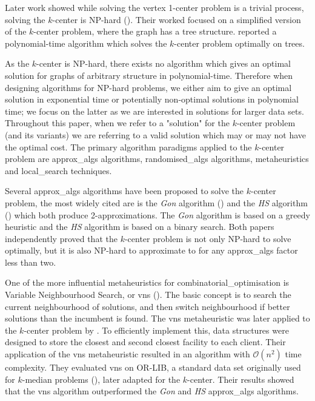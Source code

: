 Later work showed while solving the vertex 1-center problem is a trivial process, solving the $k$-center is NP-hard (\cite{kariv_algorithmic_1979}). Their worked focused on a simplified version of the $k$-center problem, where the graph has a \gls{tree} structure. \textcite{kariv_algorithmic_1979} reported a polynomial-time algorithm which solves the $k$-center problem optimally on trees.

As the $k$-center is NP-hard, there exists no algorithm which gives an optimal solution for graphs of arbitrary structure in polynomial-time. Therefore when designing algorithms for NP-hard problems, we either aim to give an optimal solution in exponential time or potentially non-optimal solutions in polynomial time; we focus on the latter as we are interested in solutions for larger data sets. Throughout this paper, when we refer to a "solution" for the $k$-center problem (and its variants) we are referring to a valid solution which may or may not have the optimal cost. The primary algorithm paradigms applied to the $k$-center problem are \gls{approx_algs} algorithms, \gls{randomised_algs} algorithms, \glspl{metaheuristic} and \gls{local_search} techniques.

Several \gls{approx_algs} algorithms have been proposed to solve the $k$-center problem, the most widely cited are is the \emph{Gon} algorithm (\cite{gonzalez_clustering_1985}) and the \emph{HS} algorithm (\cite{hochbaum_best_1985}) which both produce 2-approximations. The \emph{Gon} algorithm is based on a greedy \gls{heuristic} and the \emph{HS} algorithm is based on a binary search. Both papers independently proved that the $k$-center problem is not only NP-hard to solve optimally, but it is also NP-hard to approximate to for any \gls{approx_algs} factor less than two.

One of the more influential \glspl{metaheuristic} for \gls{combinatorial_optimisation} is Variable Neighbourhood Search, or \acrshort{vns} (\cite{mladenovic_variable_1997}). The basic concept is to search the current neighbourhood of solutions, and then switch neighbourhood if better solutions than the incumbent is found. The \acrshort{vns} metaheuristic was later applied to the $k$-center problem by \textcite{mladenovic_solving_2003}. To efficiently implement this, data structures were designed to store the closest and second closest facility to each client. Their application of the \acrshort{vns} metaheuristic resulted in an algorithm with $\mathcal{O}(n^{2})$ time complexity. They evaluated \acrshort{vns} on OR-LIB, a standard data set originally used for $k$-median problems (\cite{beasley_note_1985}), later adapted for the $k$-center. Their results showed that the \acrshort{vns} algorithm outperformed the \emph{Gon} and \emph{HS} \gls{approx_algs} algorithms.

